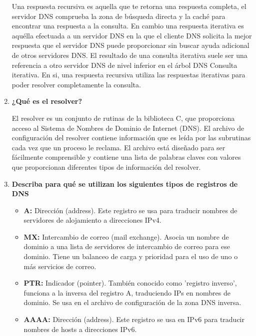 \documentclass[a4paper,10pt]{article}
\begin{document}
\begin{enumerate}
        Una respuesta recursiva es aquella que te retorna una respuesta completa, el servidor DNS comprueba la zona de búsqueda directa y la caché para encontrar una respuesta a la consulta. En cambio una respuesta iterativa es aquélla efectuada a un servidor DNS en la que el cliente DNS solicita la mejor respuesta que el servidor DNS puede proporcionar sin buscar ayuda adicional de otros servidores DNS. El resultado de una consulta iterativa suele ser una referencia a otro servidor DNS de nivel inferior en el árbol DNS Consulta iterativa.
        En si, una respuesta recursiva utiliza las respuestas iterativas para poder resolver completamente la consulta.
        
        \item \textbf{¿Qué es el resolver?}
        
        El resolver es un conjunto de rutinas de la biblioteca C, que proporciona acceso al Sistema de Nombres de Dominio de Internet (DNS). El archivo de configuración del resolver contiene información que es leída por las subrutinas cada vez que un proceso le reclama. El archivo está diseñado para ser fácilmente comprensible y contiene una lista de palabras claves con valores que proporcionan diferentes tipos de información del resolver.
        
        \item \textbf{Describa para qué se utilizan los siguientes tipos de registros de DNS}
        
            \begin{itemize}
                \item \textbf{A:} Dirección (address). Este registro se usa para traducir nombres de servidores de alojamiento a direcciones IPv4. 
                
                \item \textbf{MX:} Intercambio de correo (mail exchange). Asocia un nombre de dominio a una lista de servidores de intercambio de correo para ese dominio. Tiene un balanceo de carga y prioridad para el uso de uno o más servicios de correo.
                
                \item \textbf{PTR:} Indicador (pointer). También conocido como ’registro inverso’, funciona a la inversa del registro A, traduciendo IPs en nombres de dominio. Se usa en el archivo de configuración de la zona DNS inversa.
                
                \item \textbf{AAAA:} Dirección (address). Este registro se usa en IPv6 para traducir nombres de hosts a direcciones IPv6.
                

\end{itemize}
\end{enumerate}
\end{document}
